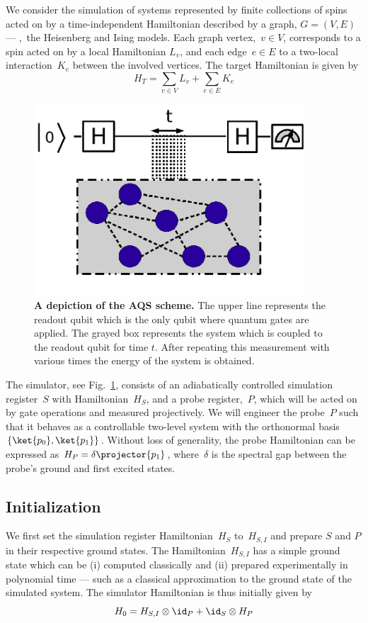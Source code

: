 \documentclass[11pt,oneside,final]{huthesis}%
\begin{document}
We consider the simulation of systems represented by finite collections
of spins acted on by a time-independent Hamiltonian described by a graph,
$G = (V, E)$ --- \eg,~the Heisenberg and Ising models.
Each graph vertex,~$v\in V$, corresponds to a spin acted on by a local
Hamiltonian $L_{v}$, and each edge~$e\in E$ to a
two-local interaction~$K_{e}$ between the involved vertices.
The  target Hamiltonian is given by
\begin{equation}
H_{T} = \sum_{v \in V} L_v +\sum_{e \in E} K_e
\end{equation}

\begin{figure}
	\begin{center}
		\includegraphics[width=4in]{./figures/figgy3}
	\end{center}
	\caption{\textbf{A depiction of the AQS scheme.}  The upper line represents the readout qubit which is the only qubit where quantum gates are applied.  The grayed box represents the system which is coupled to the readout qubit for time $t$.  After repeating this measurement with various times the energy of the system is obtained. }
	\label{fig:AQC}
\end{figure}

The simulator, see Fig.~\ref{fig:AQC}, consists of an adiabatically controlled
simulation register~$S$ with Hamiltonian~$H_S$, and a probe register,~$P$,
which will be acted on by gate operations and measured projectively. 
We will engineer the probe~$P$ such that it behaves as a controllable
two-level system with the orthonormal basis $\{\ket{p_0}, \ket{p_1}\}$.
Without loss of generality, the probe Hamiltonian can be expressed as
$H_P = \delta \projector{p_1}$, where~$\delta$ is the spectral gap
between the probe's ground and first excited states.


\subsection{Initialization}
We first set the simulation register Hamiltonian~$H_S$
to~$H_{S,I}$ and prepare $S$ and $P$ in their respective
ground states.  The Hamiltonian~$H_{S,I}$ has a simple
ground state which can be (i) computed classically and (ii) prepared
experimentally in polynomial time --- such as a classical approximation to
the
ground
state of the simulated system. 
The simulator Hamiltonian is thus initially given by
\begin{equation}
H_0 = H_{S,I} \otimes \id_P + \id_S \otimes H_P
\end{equation}
\end{document}
